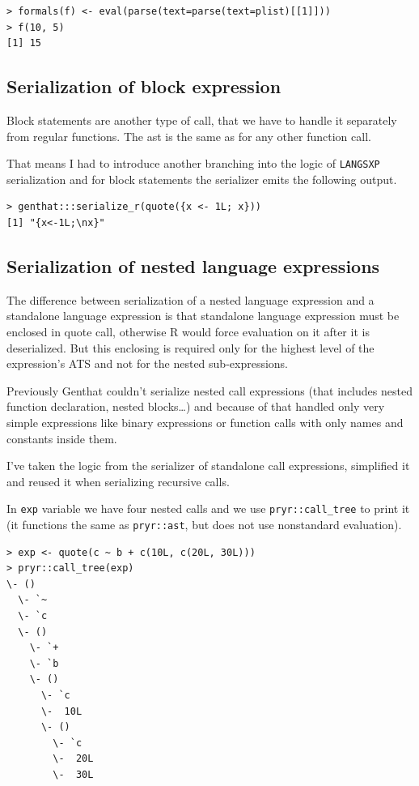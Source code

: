 \documentclass[thesis=B,english]{FITthesis}[2012/10/20]
\begin{document}
\begin{verbatim}
> formals(f) <- eval(parse(text=parse(text=plist)[[1]]))
> f(10, 5)
[1] 15

\end{verbatim}

\subsection{Serialization of block expression}
Block statements are another type of call, that we have to handle it separately from regular functions. The ast is the same as for any other function call.

That means I had to introduce another branching into the logic of \verb|LANGSXP| serialization and for block statements the serializer emits the following output.

\begin{verbatim}
> genthat:::serialize_r(quote({x <- 1L; x}))
[1] "{x<-1L;\nx}"
\end{verbatim}

\subsection{Serialization of nested language expressions}
The difference between serialization of a nested language expression and a standalone language expression is that standalone language expression must be enclosed in quote call, otherwise R would force evaluation on it after it is deserialized. But this enclosing is required only for the highest level of the expression’s ATS and not for the nested sub-expressions. 

Previously Genthat couldn’t serialize nested call expressions (that includes nested function declaration, nested blocks…) and because of that handled only very simple expressions like binary expressions or function calls with only names and constants inside them.

I’ve taken the logic from the serializer of standalone call expressions, simplified it and reused it when serializing recursive calls.

In \verb|exp| variable we have four nested calls and we use \verb|pryr::call_tree| to print it (it functions the same as \verb|pryr::ast|, but does not use nonstandard evaluation).


\begin{verbatim}
> exp <- quote(c ~ b + c(10L, c(20L, 30L)))
> pryr::call_tree(exp)
\- ()
  \- `~
  \- `c
  \- ()
    \- `+
    \- `b
    \- ()
      \- `c
      \-  10L
      \- ()
        \- `c
        \-  20L
        \-  30L
\end{verbatim}
\end{document}
